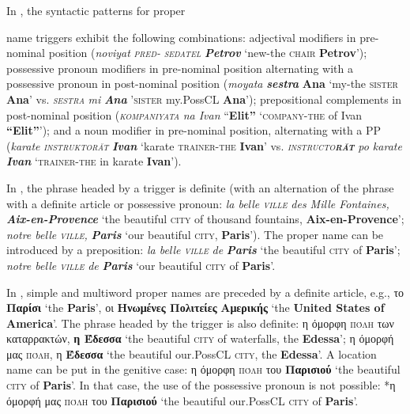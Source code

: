\documentclass[output=paper]{langsci/langscibook}
\newcommand{\trigger}[1]{\textsc{#1}}
\begin{document}
  
In , the syntactic patterns for proper {name triggers exhibit
the following combinations: adjectival modifiers in pre-nominal
position (\textit{noviyat }\textit{\trigger{pred-}} \textit{\trigger{sedatel}} \textbf{\textit{Petrov}} `new-the \trigger{chair}\textbf{ Petrov}');
possessive pronoun modifiers in pre-nominal position alternating with a
possessive pronoun  in post-nominal position (\textit{moyata
}\textbf{\textit{sestra}} \textbf{Ana} `my-the \trigger{sister}\textbf{
Ana}' vs. \textit{\trigger{sestra}}\textit{ mi }\textbf{\textit{Ana}}
'\trigger{sister} my.PossCL \textbf{Ana}'); prepositional complements in
post-nominal position (\textit{\trigger{kompaniyata}}\textit{ na Ivan}
“\textbf{Elit”} `\trigger{company}-\trigger{the} of Ivan \textbf{“Elit”}');
and a noun modifier in pre-nominal position, alternating with a PP
(\textit{karate }\textit{\trigger{instruktorăt}}\textbf{\textit{ Ivan}}
`karate \trigger{trainer-the}\textbf{ Ivan}' vs.
\textit{\trigger{instructo}}\textbf{\textit{\trigger{răt}}}\textbf{\textit{
}}\textit{po karate }\textbf{\textit{Ivan}} `\trigger{trainer-the} in
karate \textbf{Ivan}').



In , the phrase headed by a trigger is definite (with an
alternation of the phrase with a definite article or possessive
pronoun: \textit{la belle }\textit{\trigger{ville}} \textit{des Mille
Fontaines, }\textbf{\textit{Aix-en-Provence}} ‘the beautiful
\trigger{city} of thousand fountains, \textbf{Aix-en-Provence}’;
\textit{notre belle }\textit{\trigger{ville}}\textit{,}
\textbf{\textit{Paris}} ‘our beautiful \trigger{city}, \textbf{Paris}’).
The proper name can be introduced by a preposition: \textit{la belle
}\textit{\trigger{ville}} \textit{de }\textbf{\textit{Paris}} ‘the
beautiful \trigger{city} of \textbf{Paris}’; \textit{notre belle
}\textit{\trigger{ville}} \textit{de }\textbf{\textit{Paris}} ‘our
beautiful \trigger{city} of \textbf{Paris}’.



In , simple and multiword proper names are preceded by a definite
article, e.g., το \textbf{Παρίσι} ‘the
\textbf{Paris}’, οι \textbf{Ηνωμένες Πολιτείες}
\textbf{Αμερικής} ‘the \textbf{United States of America}’. The
phrase headed by the trigger is also definite: η όμορφη
\trigger{πόλη} των καταρρακτών, \textbf{η
Έδεσσα} ‘the beautiful \trigger{city} of waterfalls, the
\textbf{Edessa}’; η όμορφή μας \trigger{πόλη},
η \textbf{Έδεσσα} ‘the beautiful our.PossCL \trigger{city}, the
\textbf{Edessa}’. A location name can be put in the genitive case:
η όμορφη \trigger{πόλη} του
\textbf{Παρισιού} ‘the beautiful \trigger{city} of
\textbf{Paris}’. In that case, the use of the possessive pronoun 
is not possible: *η όμορφή μας \trigger{πόλη}
του \textbf{Παρισιού} ‘the beautiful our.PossCL
\trigger{city} of \textbf{Paris}’.



}
\end{document}
